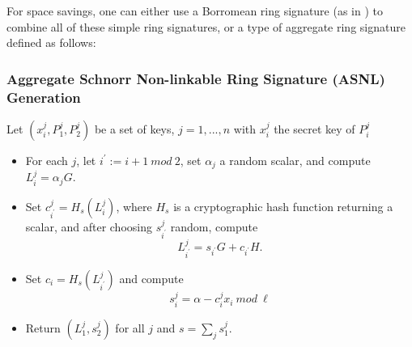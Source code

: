 \documentclass[12pt,oneside,english]{amsart}
\numberwithin{equation}{section}
\numberwithin{figure}{section}
\theoremstyle{plain}
\theoremstyle{plain}
\theoremstyle{remark}
\theoremstyle{plain}
\theoremstyle{remark}
\theoremstyle{remark}
\theoremstyle{plain}
\theoremstyle{definition}
\begin{document}
For space savings, one can either use a Borromean ring signature (as in \cite{GM}) to combine all of these simple ring signatures, or a type of aggregate ring signature defined as follows:
\subsubsection{ Aggregate Schnorr Non-linkable Ring Signature (ASNL) Generation} 
Let $(x_i^j, P_1^j, P_2^j)$ be a set of keys, $j=1,...,n$ with $x_i^j$ the secret key of $P_i^j$
\begin{itemize}
 \item For each $j$, let $i^\prime := i+1\  mod\  2$, set $\alpha_j$ a random scalar, and compute $L_i^j = \alpha_j G$. 
 \item Set $c_{i^\prime}^j= H_s(L_i^j)$, where $H_s$ is a cryptographic hash function returning a scalar, and after choosing $s_{i^\prime}^j$ random, compute
 \[
L_{i^\prime}^j = s_{i^\prime} G + c_{i^\prime} H. 
 \]
 \item Set $c_i = H_s(L_{i^\prime}^j)$ and compute
 \[
 s_i^j = \alpha - c_i^j x_i \ mod\ \ell 
 \]
 \item Return $(L_1^j, s_2^j)$ for all $j$ and $s = \sum_j s_1^j$. 
\end{itemize}
\end{document}
